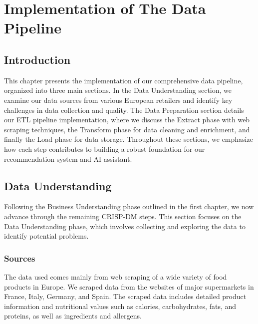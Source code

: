 \chapter{Implementation of The Data Pipeline}
\section*{Introduction}

This chapter presents the implementation of our comprehensive data pipeline, organized into three main sections. 
In the Data Understanding section, we examine our data sources from various European retailers and identify key challenges in data collection and quality. 
The Data Preparation section details our ETL pipeline implementation, where we discuss the Extract phase with web scraping techniques, the Transform phase for data cleaning and enrichment, and finally the Load phase for data storage. 
Throughout these sections, we emphasize how each step contributes to building a robust foundation for our recommendation system and AI assistant. 

\section{Data Understanding}
Following the Business Understanding phase outlined in the first
chapter, we now advance through the remaining CRISP-DM steps.
This section focuses on the Data Understanding phase, which involves
collecting and exploring the data to identify potential problems.

\subsection{Sources}

\par The data used comes mainly from web scraping of a wide variety of
food products in Europe. We scraped data from the websites of major
supermarkets in France, Italy, Germany, and Spain.
The scraped data includes detailed product information and nutritional
values such as calories, carbohydrates, fats, and proteins, as well as
ingredients and allergens.


